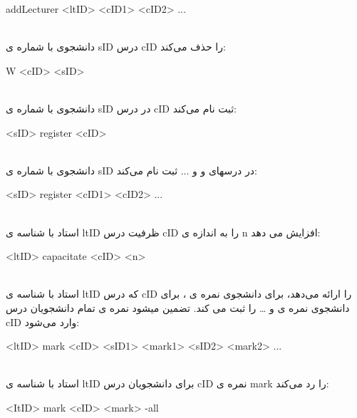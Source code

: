 \documentclass[]{article}
\begin{document}
\begin{tcolorbox}[boxrule=0pt]
	\begin{latin}
  	  \large{
  	  	addLecturer <ltID> <cID1> <cID2> ...
		}
	\end{latin}
\end{tcolorbox}
\noindent
\\دانشجوی با شماره ی   sID درس  cID را حذف می‌کند:
\begin{tcolorbox}[boxrule=0pt]
	\begin{latin}
  	  \large{
  	  	W <cID> <sID>
		}
	\end{latin}
\end{tcolorbox}
\noindent
\\دانشجوی با شماره ی sID در درس cID  ثبت نام می‌کند:
\begin{tcolorbox}[boxrule=0pt]
	\begin{latin}
  	  \large{
  	  	<sID> register <cID>
		}
	\end{latin}
\end{tcolorbox}
\noindent
\\دانشجوی با شماره ی  sID در درسهای   و   و ... ثبت نام می‌کند:
\begin{tcolorbox}[boxrule=0pt]
	\begin{latin}
  	  \large{
  	  	<sID> register <cID1> <cID2> ...
		}
	\end{latin}
\end{tcolorbox}
\noindent
\\ استاد با شناسه ی ltID  ظرفیت درس cID  را به اندازه ی n  افزایش می دهد:
\begin{tcolorbox}[boxrule=0pt]
	\begin{latin}
  	  \large{
  	  	<ltID> capacitate <cID> <n>
		}
	\end{latin}
\end{tcolorbox}
\noindent
\\استاد با شناسه ی ltID که درس cID را ارائه می‌دهد، برای دانشجوی   نمره ی  ، برای دانشجوی  نمره ی  و … را ثبت می کند. تضمین میشود نمره ی تمام دانشجویان درس cID وارد می‌شود:
\begin{tcolorbox}[boxrule=0pt]
	\begin{latin}
  	  \large{
  	  	<ltID> mark <cID> <sID1> <mark1> <sID2> <mark2> ...
		}
	\end{latin}
\end{tcolorbox}
\noindent
\\استاد با شناسه ی ltID برای دانشجویان درس cID نمره ی mark  را رد می‌کند:
\begin{tcolorbox}[boxrule=0pt]
	\begin{latin}
  	  \large{
  	  	<ItID> mark <cID> <mark> -all
		}
	\end{latin}
\end{tcolorbox}
\end{document}
